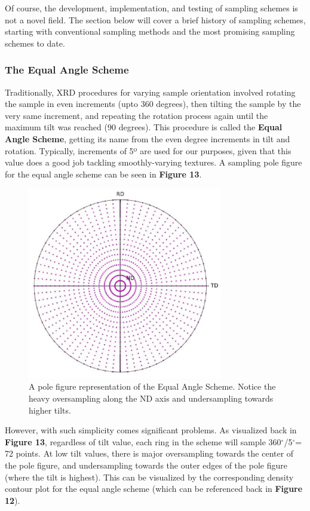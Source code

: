 \documentclass[10pt]{article}
\begin{document}
Of course, the development, implementation, and testing of sampling schemes is not a novel field. The section below will cover a brief 
history of sampling schemes, starting with conventional sampling methods and the most promising sampling schemes to date.


\subsubsection{The Equal Angle Scheme}
Traditionally, XRD procedures for varying sample orientation involved rotating the sample in even increments (upto 360 degrees), 
then tilting the sample by the very same increment, and repeating the rotation process again until the maximum tilt was reached
(90 degrees). This procedure is called the \textbf{Equal Angle Scheme}, getting its name from the even degree increments in tilt and rotation.
Typically, increments of 5º are used for our purposes, given that this value does a good job tackling smoothly-varying textures.
A sampling pole figure for the equal angle scheme can be seen in \textbf{Figure 13}.

\begin{figure}[h]
\centering
\includegraphics[width=8.5cm]{fig13}
\caption{\label{tab1}A pole figure representation of the Equal Angle Scheme. 
Notice the heavy oversampling along the ND axis and undersampling towards higher tilts.} 
\end{figure}

However, with such simplicity comes significant problems. As visualized back in \textbf{Figure 13}, regardless of tilt value, 
each ring in the scheme will sample 360$^{\circ}$/5$^{\circ}$= 72 points. At low tilt values, there is major oversampling towards the center of the pole figure, 
and undersampling towards the outer edges of the pole figure (where the tilt is highest). This can be visualized by the corresponding
density contour plot for the equal angle scheme (which can be referenced back in \textbf{Figure 12}).
\end{document}
